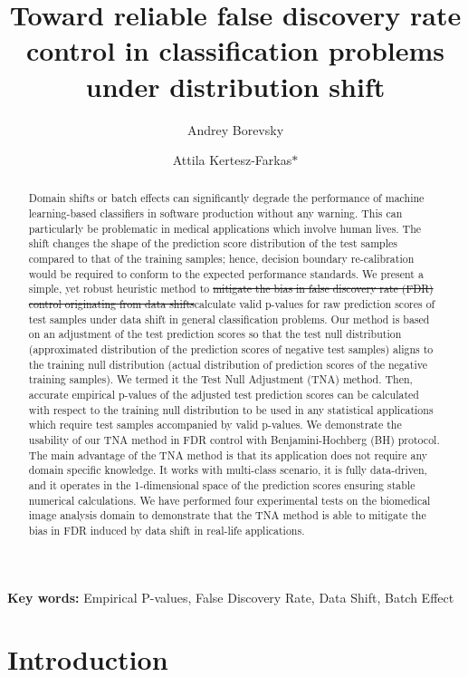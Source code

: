 \documentclass{article}
\author{Andrey Borevsky}
\author{Attila Kertesz-Farkas$\ast$}
\affil{Laboratory on AI for Computational Biology, Faculty of Computer Science, HSE University,  11 Pokrovsky Bvld., Moscow 109028, Russian Federation}
\title{Toward reliable false discovery rate control in classification problems under distribution shift}
\newcommand{\correction}[2]{{\color{red}\sout{#1}}{\color{red}#2}}
\newcommand{\edit}[1]{{\color{red}#1}}
\begin{document}
\maketitle

\begin{abstract}
	Domain shifts or batch effects can significantly degrade the performance of machine learning-based classifiers in software production without any warning. This can particularly be problematic in medical applications which involve human lives. The shift changes the shape of the prediction score distribution of the test samples compared to that of the training samples; hence, decision boundary re-calibration would be required to conform to the expected performance standards. We present a simple, yet robust heuristic method to \correction{mitigate the bias in false discovery rate (FDR) control originating from data shifts}{calculate valid p-values for raw prediction scores of test samples under data shift in general classification problems.} Our method is based on an adjustment of the test prediction scores so that the test null distribution (approximated distribution of the prediction scores of negative test samples) aligns to the training null distribution (actual distribution of prediction scores of the negative training samples). We termed it the Test Null Adjustment (TNA) method. Then, accurate empirical p-values of the adjusted test prediction scores can be calculated with respect to the training null distribution to be used \edit{ in any statistical applications which require test samples accompanied by valid p-values. We demonstrate the usability of our TNA method in FDR control with Benjamini-Hochberg (BH) protocol.} The main advantage of the TNA method is that its application does not require any domain specific knowledge. It works with multi-class scenario, it is fully data-driven, and it operates in the 1-dimensional space of the prediction scores ensuring stable numerical calculations. We have performed four experimental tests on the biomedical image analysis domain to demonstrate that the TNA method is able to mitigate the bias in FDR induced by data shift in real-life applications. 


\end{abstract}
\textbf{Key words:} Empirical P-values, False Discovery Rate, Data Shift, Batch Effect

\section{Introduction}
\end{document}
